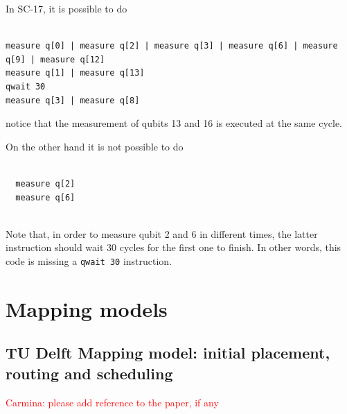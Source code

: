 \documentclass[11pt]{article}
\begin{document}
\begin{minipage}[t]{.45\textwidth}

In SC-17, it is possible to do

\begin{verbatim}
  
measure q[0] | measure q[2] | measure q[3] | measure q[6] | measure q[9] | measure q[12]
measure q[1] | measure q[13]
qwait 30
measure q[3] | measure q[8]

\end{verbatim}

notice that the measurement of qubits 13 and 16 is executed at the same cycle.     

\end{minipage}
\hfill %
\begin{minipage}[t]{.45\textwidth}

On the other hand it is not possible to do

\begin{verbatim}
  
  measure q[2]
  measure q[6]
  
\end{verbatim}

Note that, in order to measure qubit 2 and 6 in different times, the latter instruction should wait 30 cycles for the first one to finish. In other words, this code is missing a \texttt{qwait 30} instruction.

\end{minipage}











\section{Mapping models}

\subsection{TU Delft Mapping model: initial placement, routing and scheduling}

\textcolor{red}{Carmina: please add reference to the paper, if any}
\end{document}
